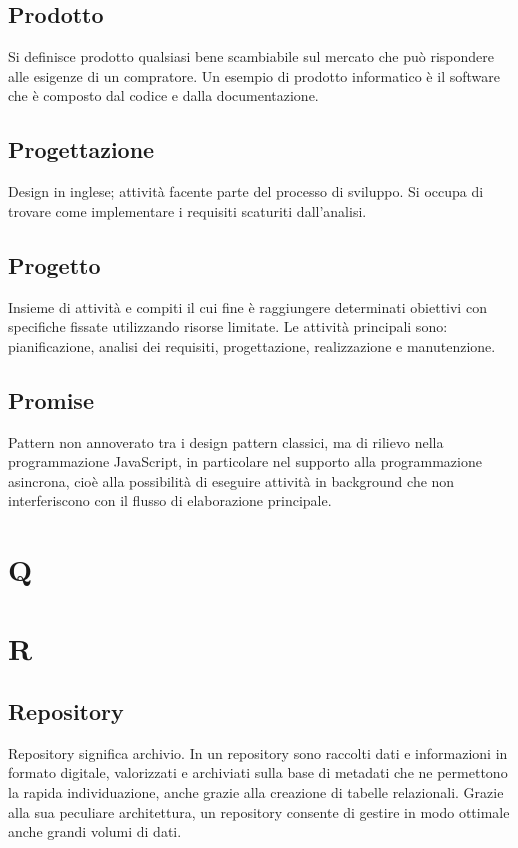 \subsection*{Prodotto}
Si definisce prodotto qualsiasi bene scambiabile sul mercato che può rispondere alle esigenze di un compratore. Un esempio di prodotto informatico è il software che è composto dal codice e dalla documentazione.

\subsection*{Progettazione}
Design in inglese; attività facente parte del processo di sviluppo. Si occupa di trovare come implementare i requisiti scaturiti dall'analisi.

\subsection*{Progetto}
Insieme di attività e compiti il cui fine è raggiungere determinati obiettivi con specifiche fissate utilizzando risorse limitate. Le attività principali sono: pianificazione, analisi dei requisiti, progettazione, realizzazione e manutenzione.

\subsection*{Promise}
Pattern non annoverato tra i design pattern classici, ma di rilievo nella programmazione JavaScript, in particolare nel supporto alla programmazione asincrona, cioè alla possibilità di eseguire attività in background che non interferiscono con il flusso di elaborazione principale.

\clearpage
\section*{Q}

\clearpage
\section*{R}

\subsection*{Repository}
Repository significa archivio. In un repository sono raccolti dati e informazioni in formato digitale, valorizzati e archiviati sulla base di metadati che ne permettono la rapida individuazione, anche grazie alla creazione di tabelle relazionali. Grazie alla sua peculiare architettura, un repository consente di gestire in modo ottimale anche grandi volumi di dati.

